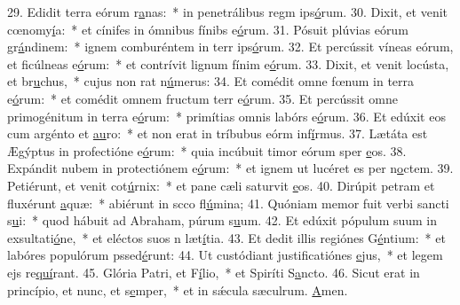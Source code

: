 29. Edidit terra eórum r\uline{a}nas:~* in penetrálibus regm ips\uline{ó}rum.
30. Dixit, et venit cœnomy\uline{í}a:~* et cínifes in ómnibus fínibs e\uline{ó}rum.
31. Pósuit plúvias eórum gr\uline{á}ndinem:~* ignem comburéntem in terr ips\uline{ó}rum.
32. Et percússit víneas eórum, et ficúlneas e\uline{ó}rum:~* et contrívit lignum fínim e\uline{ó}rum.
33. Dixit, et venit locústa, et br\uline{u}chus,~* cujus non rat n\uline{ú}merus:
34. Et comédit omne fœnum in terra e\uline{ó}rum:~* et comédit omnem fructum terr e\uline{ó}rum.
35. Et percússit omne primogénitum in terra e\uline{ó}rum:~* primítias omnis labórs e\uline{ó}rum.
36. Et edúxit eos cum argénto et \uline{au}ro:~* et non erat in tríbubus eórm inf\uline{í}rmus.
37. Lætáta est Ægýptus in profectióne e\uline{ó}rum:~* quia incúbuit timor eórum sper \uline{e}os.
38. Expándit nubem in protectiónem e\uline{ó}rum:~* et ignem ut lucéret es per n\uline{o}ctem.
39. Petiérunt, et venit cot\uline{ú}rnix:~* et pane cæli saturvit \uline{e}os.
40. Dirúpit petram et fluxérunt \uline{a}quæ:~* abiérunt in scco fl\uline{ú}mina;
41. Quóniam memor fuit verbi sancti s\uline{u}i:~* quod hábuit ad Abraham, púrum s\uline{u}um.
42. Et edúxit pópulum suum in exsultati\uline{ó}ne,~* et eléctos suos n læt\uline{í}tia.
43. Et dedit illis regiónes G\uline{é}ntium:~* et labóres populórum pssed\uline{é}runt:
44. Ut custódiant justificatiónes \uline{e}jus,~* et legem ejs re\uline{quí}rant.
45. Glória Patri, et F\uline{í}lio,~* et Spiríti S\uline{a}ncto.
46. Sicut erat in princípio, et nunc, et s\uline{e}mper,~* et in sǽcula sæculrum. \uline{A}men.
